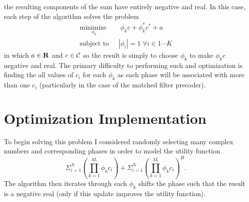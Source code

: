 \documentclass[12pt,a4paper]{report}
\begin{document}
	the resulting components of the sum have entirely negative and real. In this case, each step of the algorithm solves the problem
			\begin{align}
	    \underset{\phi_k}{\text{minimize }}
	    & \; \phi_k c + \phi_k^* c^* + a 
	     \\
	    \text{subject to  } \; &
	    | \phi_i | = 1   \; \forall i \in {1 \cdots	 K}
	\end{align}\label{mse_problem_s}
	in which $a \in {\mbox{\bf R}}$ and $c \in \mathcal{C}$ so the result is simply to choose $\phi_k$ to make $\phi_k c$ negative and real.
	The primary difficulty to performing such and optimization is finding the all values of $ c_i $ for each $\phi_{k}$ as each phase will be associated with 
	more than one $ c_i $ (particularly in the case of the matched filter precoder).
\section{Optimization Implementation}
To begin solving this problem I considered randomly selecting many complex numbers and corresponding phases in order to model the utility function 
	\begin{equation}
	\Sigma_{i=1}^{N} \left(\prod_{k=1}^{M_i}\phi_{k} c_i \right ) +  \Sigma_{i=1}^{N} \left(\prod_{k=1}^{M_i}\phi_{k} c_i \right)^H.
	\end{equation}
	The algorithm then iterates through each $\phi_{k}$ shifts the phase such that the result is a negative real (only if this update improves the utility function).

\end{document}
